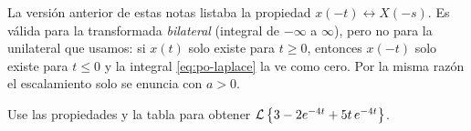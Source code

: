 \begin{profundiza}
La versión anterior de estas notas listaba la propiedad $x(-t)\leftrightarrow X(-s)$. Es válida para la transformada \emph{bilateral} (integral de $-\infty$ a $\infty$), pero no para la unilateral que usamos: si $x(t)$ solo existe para $t\geq0$, entonces $x(-t)$ solo existe para $t\leq0$ y la integral \eqref{eq:po-laplace} la ve como cero. Por la misma razón el escalamiento solo se enuncia con $a>0$.
\end{profundiza}

\begin{pausa}
Use las propiedades y la tabla para obtener $\mathcal{L}\left\{3-2e^{-4t}+5t\,e^{-4t}\right\}$.
\end{pausa}
